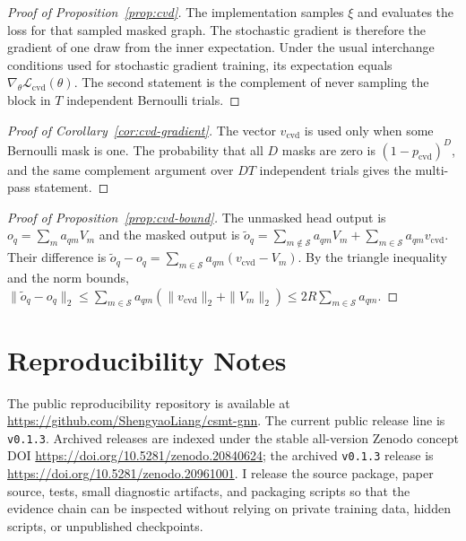 \documentclass[10pt]{article}
\begin{document}
\begin{proof}[Proof of Proposition~\ref{prop:cvd}]
The implementation samples $\xi$ and evaluates the loss for that sampled masked
graph.  The stochastic gradient is therefore the gradient of one draw from the
inner expectation.  Under the usual interchange conditions used for stochastic
gradient training, its expectation equals
$\nabla_\theta \mathcal{L}_{\mathrm{cvd}}(\theta)$.  The second statement is the
complement of never sampling the block in $T$ independent Bernoulli trials.
\end{proof}

\begin{proof}[Proof of Corollary~\ref{cor:cvd-gradient}]
The vector $v_{\mathrm{cvd}}$ is used only when some Bernoulli mask is one.  The
probability that all $D$ masks are zero is $(1-p_{\mathrm{cvd}})^D$, and the
same complement argument over $DT$ independent trials gives the multi-pass
statement.
\end{proof}

\begin{proof}[Proof of Proposition~\ref{prop:cvd-bound}]
The unmasked head output is $o_q=\sum_m a_{qm}V_m$ and the masked output is
$\tilde o_q=\sum_{m\notin\mathcal{S}}a_{qm}V_m+
\sum_{m\in\mathcal{S}}a_{qm}v_{\mathrm{cvd}}$.  Their difference is
$\tilde o_q-o_q=\sum_{m\in\mathcal{S}}a_{qm}(v_{\mathrm{cvd}}-V_m)$.  By the
triangle inequality and the norm bounds,
$\|\tilde o_q-o_q\|_2\le\sum_{m\in\mathcal{S}}a_{qm}
(\|v_{\mathrm{cvd}}\|_2+\|V_m\|_2)\le 2R\sum_{m\in\mathcal{S}}a_{qm}$.
\end{proof}

\section{Reproducibility Notes}

The public reproducibility repository is available at
\href{https://github.com/ShengyaoLiang/csmt-gnn}{https://github.com/ShengyaoLiang/csmt-gnn}.
The current public release line is \texttt{v0.1.3}.  Archived releases are
indexed under the stable all-version Zenodo concept DOI
\href{https://doi.org/10.5281/zenodo.20840624}{https://doi.org/10.5281/zenodo.20840624};
the archived \texttt{v0.1.3} release is
\href{https://doi.org/10.5281/zenodo.20961001}{https://doi.org/10.5281/zenodo.20961001}.
I release the source package, paper source, tests, small diagnostic artifacts,
and packaging scripts so that the evidence chain can be inspected without
relying on private training data, hidden scripts, or unpublished checkpoints.
\end{document}

